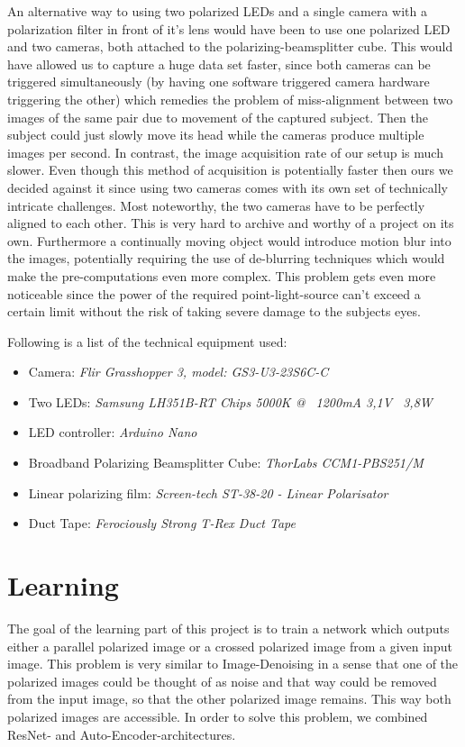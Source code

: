 \documentclass[sigconf]{acmart}
\begin{document}
An alternative way to using two polarized LEDs and a single camera with a polarization filter in front of it's lens would have been to use one polarized LED and two cameras, both attached to the polarizing-beamsplitter cube. This would have allowed us to capture a huge data set faster, since both cameras can be triggered simultaneously (by having one software triggered camera hardware triggering the other) which remedies the problem of miss-alignment between two images of the same pair due to movement of the captured subject. Then the subject could just slowly move its head while the cameras produce multiple images per second. In contrast, the image acquisition rate of our setup is much slower.
Even though this method of acquisition is potentially faster then ours we decided against it since using two cameras comes with its own set of technically intricate challenges. Most noteworthy, the two cameras have to be perfectly aligned to each other. This is very hard to archive and worthy of a project on its own. Furthermore a continually moving object would introduce motion blur into the images, potentially requiring the use of de-blurring techniques which would make the pre-computations even more complex. This problem gets even more noticeable since the power of the required point-light-source can't exceed a certain limit without the risk of taking severe damage to the subjects eyes. 

Following is a list of the technical equipment used:
\begin{itemize}
  \item Camera: \emph{Flir Grasshopper 3, model: GS3-U3-23S6C-C}
  \item Two LEDs: \emph{Samsung LH351B-RT Chips 5000K @ ~1200mA 3,1V ~3,8W}
  \item LED controller: \emph{Arduino Nano}
  \item Broadband Polarizing Beamsplitter Cube: \emph{ThorLabs CCM1-PBS251/M}
  \item Linear polarizing film: \emph{Screen-tech ST-38-20 - Linear Polarisator}
  \item Duct Tape: \emph{Ferociously Strong T-Rex Duct Tape}
\end{itemize}

\section{Learning}
The goal of the learning part of this project is to train a network which outputs either a parallel polarized image or a crossed polarized image from a given input image. This problem is very similar to Image-Denoising in a sense that one of the polarized images could be thought of as noise and that way could be removed from the input image, so that the other polarized image remains. This way both polarized images are accessible. In order to solve this problem, we combined ResNet- and Auto-Encoder-architectures.
\end{document}
